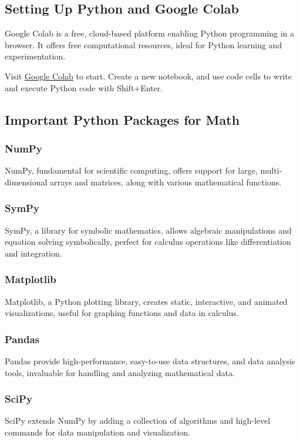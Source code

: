 \documentclass[a4paper,12pt]{book}
\begin{document}
\subsection*{Setting Up Python and Google Colab}

Google Colab is a free, cloud-based platform enabling Python programming in a browser. It offers free computational resources, ideal for Python learning and experimentation.

Visit \href{https://colab.research.google.com/}{Google Colab} to start. Create a new notebook, and use code cells to write and execute Python code with Shift+Enter.

\subsection*{Important Python Packages for Math}

\subsubsection*{NumPy}
NumPy, fundamental for scientific computing, offers support for large, multi-dimensional arrays and matrices, along with various mathematical functions.

\subsubsection*{SymPy}
SymPy, a library for symbolic mathematics, allows algebraic manipulations and equation solving symbolically, perfect for calculus operations like differentiation and integration.

\subsubsection*{Matplotlib}
Matplotlib, a Python plotting library, creates static, interactive, and animated visualizations, useful for graphing functions and data in calculus.

\subsubsection*{Pandas}
Pandas provide high-performance, easy-to-use data structures, and data analysis tools, invaluable for handling and analyzing mathematical data.

\subsubsection*{SciPy}
SciPy extends NumPy by adding a collection of algorithms and high-level commands for data manipulation and visualization.
\end{document}
